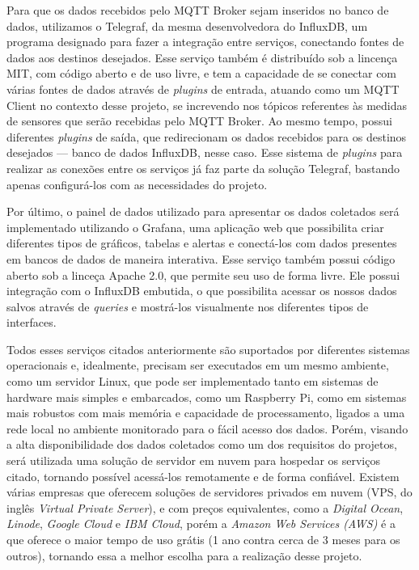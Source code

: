 \documentclass[../monografia.tex]{subfiles}
\begin{document}
Para que os dados recebidos pelo MQTT Broker sejam inseridos no banco de dados, utilizamos o Telegraf, da mesma desenvolvedora do InfluxDB, um programa designado para fazer a integração entre serviços, conectando fontes de dados aos destinos desejados. Esse serviço também é distribuído sob a lincença MIT, com código aberto e de uso livre, e tem a capacidade de se conectar com várias fontes de dados através de \textit{plugins} de entrada, atuando como um MQTT Client no contexto desse projeto, se increvendo nos tópicos referentes às medidas de sensores que serão recebidas pelo MQTT Broker. Ao mesmo tempo, possui diferentes \textit{plugins} de saída, que redirecionam os dados recebidos para os destinos desejados --- banco de dados InfluxDB, nesse caso. Esse sistema de \textit{plugins} para realizar as conexões entre os serviços já faz parte da solução Telegraf, bastando apenas configurá-los com as necessidades do projeto.

Por último, o painel de dados utilizado para apresentar os dados coletados será implementado utilizando o Grafana, uma aplicação web que possibilita criar diferentes tipos de gráficos, tabelas e alertas e conectá-los com dados presentes em bancos de dados de maneira interativa. Esse serviço também possui código aberto sob a linceça Apache 2.0, que permite seu uso de forma livre. Ele possui integração com o InfluxDB embutida, o que possibilita acessar os nossos dados salvos através de \textit{queries} e mostrá-los visualmente nos diferentes tipos de interfaces.



Todos esses serviços citados anteriormente são suportados por diferentes sistemas operacionais e, idealmente, precisam ser executados em um mesmo ambiente, como um servidor Linux, que pode ser implementado tanto em sistemas de hardware mais simples e embarcados, como um Raspberry Pi, como em sistemas mais robustos com mais memória e capacidade de processamento, ligados a uma rede local no ambiente monitorado para o fácil acesso dos dados. Porém, visando a alta disponibilidade dos dados coletados como um dos requisitos do projetos, será utilizada uma solução de servidor em nuvem para hospedar os serviços citado, tornando possível acessá-los remotamente e de forma confiável. Existem várias empresas que oferecem soluções de servidores privados em nuvem (VPS, do inglês \textit{Virtual Private Server}), e com preços equivalentes, como a \textit{Digital Ocean}, \textit{Linode}, \textit{Google Cloud} e \textit{IBM Cloud}, porém a \textit{Amazon Web Services (AWS)} é a que oferece o maior tempo de uso grátis (1 ano contra cerca de 3 meses para os outros), tornando essa a melhor escolha para a realização desse projeto. 

\end{document}
